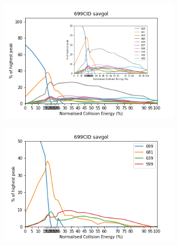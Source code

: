 \begin{figure}[!htbp]
  \begin{subfigure}[b]{0.6\textwidth}
    \includegraphics[width=\textwidth, height=\textwidth]{figures/Kapitel4/Kataboliten/diags/699CID-savgol2.png}
    \caption{}
    \label{fig:699MKLeafspraydiags1}
  \end{subfigure}
  \hfill
  \begin{subfigure}[b]{0.6\textwidth}
    \includegraphics[width=\textwidth, height=\textwidth]{figures/Kapitel4/Kataboliten/diags/699CID-savgol1.png}
    \caption{}
    \label{fig:699MKstructurediags2}
  \end{subfigure}
  

\end{figure}
